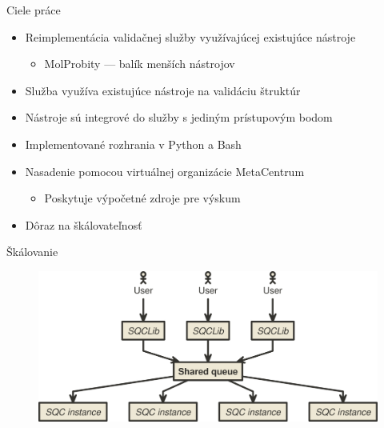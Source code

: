 \documentclass[
  aspectratio=169,
]{beamer}
\begin{document}
\begin{frame}{Ciele práce}
	\begin{itemize}
		\item Reimplementácia validačnej služby využívajúcej existujúce nástroje
		      \begin{itemize}
			      \item MolProbity --- balík menších nástrojov
		      \end{itemize}

		\item Služba využíva existujúce nástroje na validáciu štruktúr
		\item Nástroje sú integrové do služby s jediným prístupovým bodom
		\item Implementované rozhrania v Python a Bash
    \item Nasadenie pomocou virtuálnej organizácie MetaCentrum
    \begin{itemize}
      \item Poskytuje výpočetné zdroje pre výskum
    \end{itemize}

		\item Dôraz na škálovateľnosť
	\end{itemize}
\end{frame}

\begin{frame}{Škálovanie}
	\begin{figure}
		\includegraphics[width=.8\textwidth,height=.8\textheight,keepaspectratio]{img/diagram.png}
	\end{figure}
\end{frame}
\end{document}
